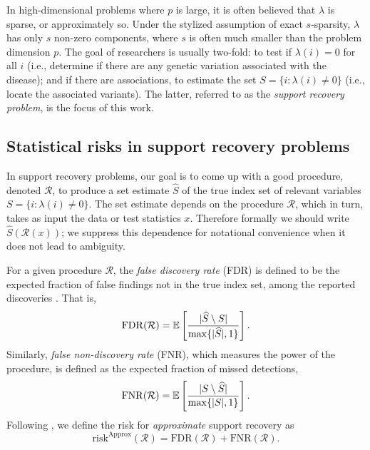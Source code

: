 In high-dimensional problems where $p$ is large, it is often believed that $\lambda$ is sparse, or approximately so.
Under the stylized assumption of exact $s$-sparsity, $\lambda$ has only $s$ non-zero components, where $s$ is often much smaller than the problem dimension $p$. 
The goal of researchers is usually two-fold: to test if $\lambda(i)=0$ for all $i$ (i.e., determine if there are any genetic variation associated with the disease); and if there are associations, to estimate the set $S=\{i:\lambda(i)\neq 0\}$ (i.e., locate the associated variants).
The latter, referred to as the \emph{support recovery problem}, is the focus of this work.

\subsection{Statistical risks in support recovery problems}
\label{subsec:risks}

In support recovery problems, our goal is to come up with a good procedure, denoted $\mathcal R$, to produce a set estimate $\widehat{S}$ of the true index set of relevant variables  $S=\{i:\lambda(i)\neq 0\}$.
The set estimate depends on the procedure $\mathcal{R}$, which in turn, takes as input the data or test statistics $x$.
Therefore formally we should write $\widehat{S}(\mathcal{R}(x))$; we suppress this dependence for notational convenience when it does not lead to ambiguity.

For a given procedure $\mathcal{R}$, the \emph{false discovery rate} (FDR) is defined to be the expected fraction of false findings not in the true index set, among the reported discoveries \cite{benjamini1995controlling}. That is,
\begin{equation} \label{eq:FDR}
    \mathrm{FDR}(\mathcal{R}) = \E\left[\frac{|\widehat{S}\setminus S|}{\max\{|\widehat{S}|,1\}}\right].
\end{equation}
Similarly, \emph{false non-discovery rate} (FNR), which measures the power of the procedure, is defined as the expected fraction of missed detections,
\begin{equation} \label{eq:FNR}
    \mathrm{FNR}(\mathcal{R}) = \E\left[\frac{|S\setminus \widehat{S}|}{\max\{|{S}|,1\}}\right].
\end{equation}
Following \cite{arias2017distribution}, we define the risk for \emph{approximate} support recovery as
\begin{equation} \label{eq:risk-approximate}
    \mathrm{risk}^{\mathrm{Approx}}(\mathcal{R}) = \mathrm{FDR}(\mathcal{R}) + \mathrm{FNR}(\mathcal{R}).
\end{equation}

